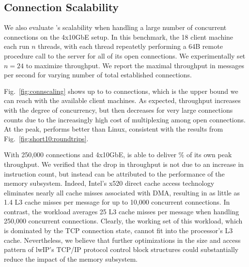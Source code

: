 \subsection{Connection Scalability}

\label{sec:eval:scale}

We also evaluate \ix's scalability when handling a large number of
concurrent connections on the 4x10GbE setup. In this benchmark, the 18 client machine each run
$n$ threads, with each thread repeatetly performing a 64B remote
procedure call to the server for all of its open connections.
We experimentally set $n=24$ to maximize throughput.  We report
the maximal throughput in messages per second for varying number of
total established connections.



Fig.~\ref{fig:connscaling} shows up to to  connections, which
is the upper bound we can reach with the available client machines.
As expected, throughput increases with the degree of concurrency, but
then decreases for very large connections counts due to the
increasingly high cost of multiplexing among open connections.  At the
peak, \ix performs  better than Linux, consistent with the results
from Fig.~\ref{fig:short10:roundtrips}.  

With 250,000 connections and
4x10GbE, \ix is able to deliver  \% of its own peak throughput.
We verified that the drop in throughput is not due to an increase in
instruction count, but instead can be attributed to the performance of
the memory subsystem. Indeed,
Intel's x520 direct cache access
technology~\cite{DBLP:conf/isca/HuggahalliIT05} eliminates nearly all
cache misses associated with DMA, resulting in as little as 1.4 L3
cache misses per message for up to 10,000 concurrent connections.  In
contrast, the workload averages 25 L3 cache misses per message when
handling 250,000 concurrent connections.  Clearly, the working set of
this workload, which is dominated by the TCP connection state, cannot
fit into the processor's L3 cache.  Nevertheless, we believe that
further optimizations in the size and access pattern of lwIP's TCP/IP
protocol control block structures could substantially reduce the
impact of the memory subsystem.
  



